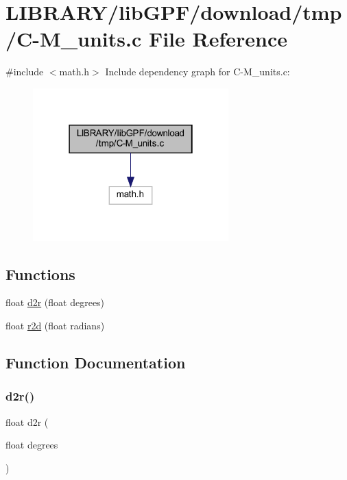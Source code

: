 \hypertarget{C-M__units_8c}{}\section{L\+I\+B\+R\+A\+R\+Y/lib\+G\+P\+F/download/tmp/\+C-\/\+M\+\_\+units.c File Reference}
\label{C-M__units_8c}
{\ttfamily \#include $<$math.\+h$>$}\newline
Include dependency graph for C-\/\+M\+\_\+units.c\+:
\nopagebreak
\begin{figure}[H]
\begin{center}
\leavevmode
\includegraphics[width=214pt]{C-M__units_8c__incl}
\end{center}
\end{figure}
\subsection*{Functions}
\begin{DoxyCompactItemize}
\item 
float \hyperlink{C-M__units_8c_a4f769afe985b27d98f3114c2cb458221}{d2r} (float degrees)
\item 
float \hyperlink{C-M__units_8c_ac021a3c865860684d655b69f1a1735e8}{r2d} (float radians)
\end{DoxyCompactItemize}


\subsection{Function Documentation}
\mbox{\label{C-M__units_8c_a4f769afe985b27d98f3114c2cb458221}} 
\subsubsection{\texorpdfstring{d2r()}{d2r()}}
{\footnotesize\ttfamily float d2r (\begin{DoxyParamCaption}\item[{float}]{degrees }\end{DoxyParamCaption})}

